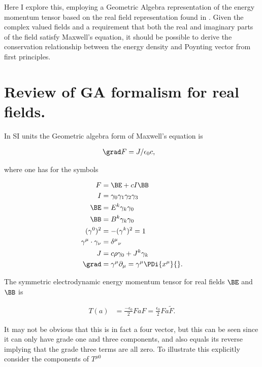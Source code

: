 Here I explore this, employing a Geometric Algebra representation of the energy momentum tensor based on the real field representation found in \cite{doran2003gap}.  Given the complex valued fields and a requirement that both the real and imaginary parts of the field satisfy Maxwell's equation, it should be possible to derive the conservation relationship between the energy density and Poynting vector from first principles.

\section{Review of GA formalism for real fields.}

In SI units the Geometric algebra form of Maxwell's equation is

\begin{align}
\label{eqn:complexFieldEnergy:4}
\grad F &= J/\epsilon_0 c,
\end{align}

where one has for the symbols

\begin{subequations}
\begin{align}
\label{eqn:complexFieldEnergy:5}
F &= \BE + c I \BB \\
I &= \gamma_0 \gamma_1 \gamma_2 \gamma_3 \\
\BE &= E^k \gamma_k \gamma_0  \\
\BB &= B^k \gamma_k \gamma_0  \\
(\gamma^0)^2 &= -(\gamma^k)^2 = 1 \\
\gamma^\mu \cdot \gamma_\nu &= {\delta^\mu}_\nu \\
J &= c \rho \gamma_0 + J^k \gamma_k \\
\grad &= \gamma^\mu \partial_\mu = \gamma^\mu \PDi{x^\mu}{}.
\end{align}
\end{subequations}

The symmetric electrodynamic energy momentum tensor for real fields $\BE$ and $\BB$ is

\begin{align}\label{eqn:complexFieldEnergy:6}
T(a) &= \frac{-\epsilon_0}{2} F a F = \frac{\epsilon_0}{2} F a \tilde{F}.
\end{align}

It may not be obvious that this is in fact a four vector, but this can be seen since it can only have grade one and three components, and also equals its reverse implying that the grade three terms are all zero.  To illustrate this explicitly consider the components of $T^{\mu 0}$

